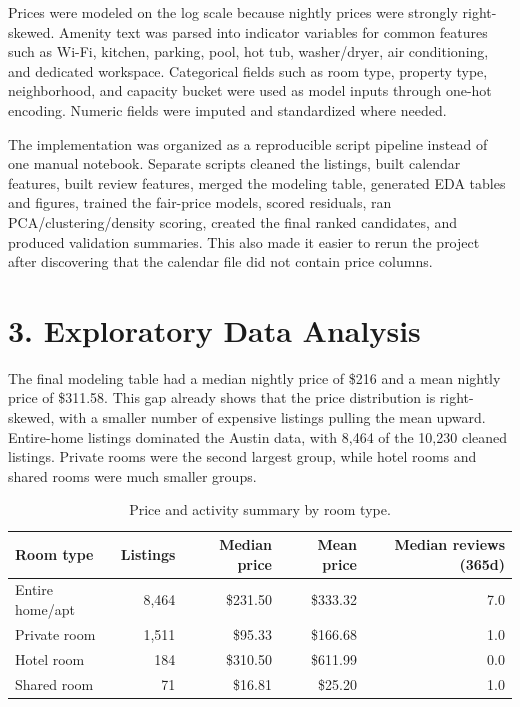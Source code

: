 \documentclass[11pt]{article}
\begin{document}
Prices were modeled on the log scale because nightly prices were strongly right-skewed. Amenity text was parsed into indicator variables for common features such as Wi-Fi, kitchen, parking, pool, hot tub, washer/dryer, air conditioning, and dedicated workspace. Categorical fields such as room type, property type, neighborhood, and capacity bucket were used as model inputs through one-hot encoding. Numeric fields were imputed and standardized where needed.

The implementation was organized as a reproducible script pipeline instead of one manual notebook. Separate scripts cleaned the listings, built calendar features, built review features, merged the modeling table, generated EDA tables and figures, trained the fair-price models, scored residuals, ran PCA/clustering/density scoring, created the final ranked candidates, and produced validation summaries. This also made it easier to rerun the project after discovering that the calendar file did not contain price columns.

\section*{3. Exploratory Data Analysis}

The final modeling table had a median nightly price of \$216 and a mean nightly price of \$311.58. This gap already shows that the price distribution is right-skewed, with a smaller number of expensive listings pulling the mean upward. Entire-home listings dominated the Austin data, with 8,464 of the 10,230 cleaned listings. Private rooms were the second largest group, while hotel rooms and shared rooms were much smaller groups.

\begin{table}[H]
\centering
\caption{Price and activity summary by room type.}
\small
\begin{tabular}{lrrrr}
\toprule
Room type & Listings & Median price & Mean price & Median reviews (365d) \\
\midrule
Entire home/apt & 8,464 & \$231.50 & \$333.32 & 7.0 \\
Private room & 1,511 & \$95.33 & \$166.68 & 1.0 \\
Hotel room & 184 & \$310.50 & \$611.99 & 0.0 \\
Shared room & 71 & \$16.81 & \$25.20 & 1.0 \\
\bottomrule
\end{tabular}
\end{table}
\end{document}
